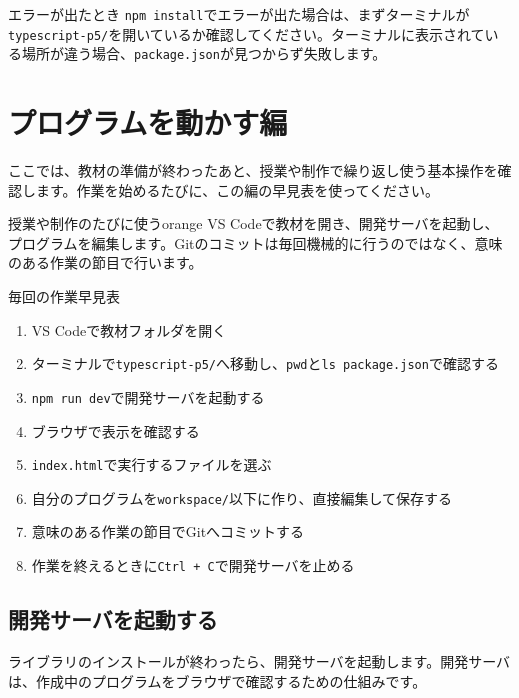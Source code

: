 \begin{notebox}{エラーが出たとき}
\texttt{npm install}でエラーが出た場合は、まずターミナルが\texttt{typescript-p5/}を開いているか確認してください。ターミナルに表示されている場所が違う場合、\texttt{package.json}が見つからず失敗します。
\end{notebox}

\section{プログラムを動かす編}
ここでは、教材の準備が終わったあと、授業や制作で繰り返し使う基本操作を確認します。作業を始めるたびに、この編の早見表を使ってください。

\begin{chapterphasebox}{授業や制作のたびに使う}{orange}
VS Codeで教材を開き、開発サーバを起動し、プログラムを編集します。Gitのコミットは毎回機械的に行うのではなく、意味のある作業の節目で行います。
\end{chapterphasebox}

\begin{pointbox}{毎回の作業早見表}
\begin{enumerate}
    \item VS Codeで教材フォルダを開く
    \item ターミナルで\texttt{typescript-p5/}へ移動し、\texttt{pwd}と\texttt{ls package.json}で確認する
    \item \texttt{npm run dev}で開発サーバを起動する
    \item ブラウザで表示を確認する
    \item \texttt{index.html}で実行するファイルを選ぶ
    \item 自分のプログラムを\texttt{workspace/}以下に作り、直接編集して保存する
    \item 意味のある作業の節目でGitへコミットする
    \item 作業を終えるときに\texttt{Ctrl + C}で開発サーバを止める
\end{enumerate}
\end{pointbox}

\subsection{開発サーバを起動する}

ライブラリのインストールが終わったら、開発サーバを起動します。開発サーバは、作成中のプログラムをブラウザで確認するための仕組みです。


